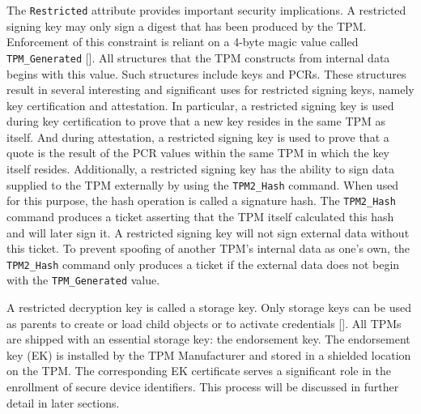 The \verb|Restricted| attribute provides important security implications. A restricted signing key may only sign a digest that has been produced by the TPM. Enforcement of this constraint is reliant on a 4-byte magic value called \verb|TPM_Generated| [\cite{TPMSpec}]. All structures that the TPM constructs from internal data begins with this value. Such structures include keys and PCRs. These structures result in several interesting and significant uses for restricted signing keys, namely key certification and attestation. In particular, a restricted signing key is used during key certification to prove that a new key resides in the same TPM as itself. And during attestation, a restricted signing key is used to prove that a quote is the result of the PCR values within the same TPM in which the key itself resides. Additionally, a restricted signing key has the ability to sign data supplied to the TPM externally by using the \verb|TPM2_Hash| command. When used for this purpose, the hash operation is called a signature hash. The \verb|TPM2_Hash| command produces a ticket asserting that the TPM itself calculated this hash and will later sign it. A restricted signing key will not sign external data without this ticket. To prevent spoofing of another TPM's internal data as one's own, the \verb|TPM2_Hash| command only produces a ticket if the external data does not begin with the \verb|TPM_Generated| value.


A restricted decryption key is called a storage key. Only storage keys can be used as parents to create or load child objects or to activate credentials [\cite{PracticalGuide}]. All TPMs are shipped with an essential storage key: the endorsement key. The endorsement key (EK) is installed by the TPM Manufacturer and stored in a shielded location on the TPM. The corresponding EK certificate serves a significant role in the enrollment of secure device identifiers. This process will be discussed in further detail in later sections.

